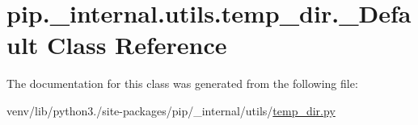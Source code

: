 \hypertarget{classpip_1_1__internal_1_1utils_1_1temp__dir_1_1__Default}{}\section{pip.\+\_\+internal.\+utils.\+temp\+\_\+dir.\+\_\+\+Default Class Reference}
\label{classpip_1_1__internal_1_1utils_1_1temp__dir_1_1__Default}


The documentation for this class was generated from the following file\+:\begin{DoxyCompactItemize}
\item 
venv/lib/python3./site-\/packages/pip/\+\_\+internal/utils/\hyperlink{temp__dir_8py}{temp\+\_\+dir.\+py}\end{DoxyCompactItemize}

